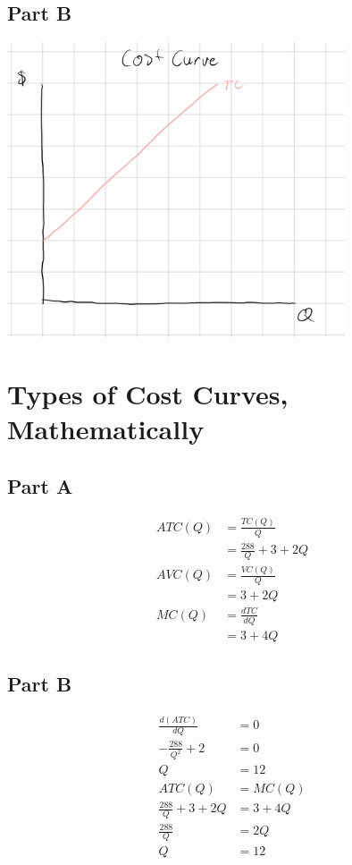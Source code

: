 \documentclass[8pt]{extarticle}
\begin{document}
{\subsection*{Part B}
\begin{center}
	\includegraphics[width=10cm]{HW7Q2B}
\end{center}
\section{Types of Cost Curves, Mathematically}
\label{sec:Types of Cost Curves, Mathematically}
\subsection*{Part A}
\begin{align*}
	\label{eq:}
	ATC(Q) &= \frac{TC(Q)}{Q} \\
	&= \frac{288}{Q} + 3 + 2Q \\
	AVC(Q) &= \frac{VC(Q)}{Q} \\
	&= 3 + 2Q \\
	MC(Q) &= \frac{dTC}{dQ} \\
	&= 3 + 4Q
\end{align*}
\subsection*{Part B}
\begin{align*}
	\label{eq:}
	\frac{d(ATC)}{dQ} &= 0 \\
	-\frac{288}{Q^2} + 2 &= 0 \\
	Q &= 12 \\
	ATC(Q) &= MC(Q) \\
	\frac{288}{Q} + 3 + 2Q &= 3 + 4Q \\
	\frac{288}{Q} &= 2Q \\
	Q &= 12 
\end{align*}
}
\end{document}
